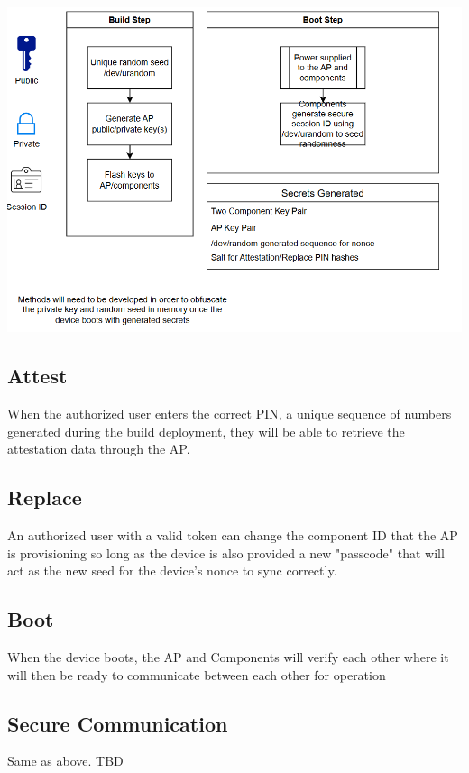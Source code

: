 \documentclass{prace}
\begin{document}
\includegraphics[scale=0.75]{./diagramSR1.png}

\subsection{Attest}

When the authorized user enters the correct PIN, a unique sequence of numbers generated during the build deployment, they will be able to 
retrieve the attestation data through the AP.

\subsection{Replace}

An authorized user with a valid token can change the component ID that the AP is provisioning so long as the device is also provided a new "passcode" that 
will act as the new seed for the device's nonce to sync correctly.

\subsection{Boot}

When the device boots, the AP and Components will verify each other where it will then be ready to communicate between each other for operation

\subsection{Secure Communication}

Same as above. TBD
\end{document}
